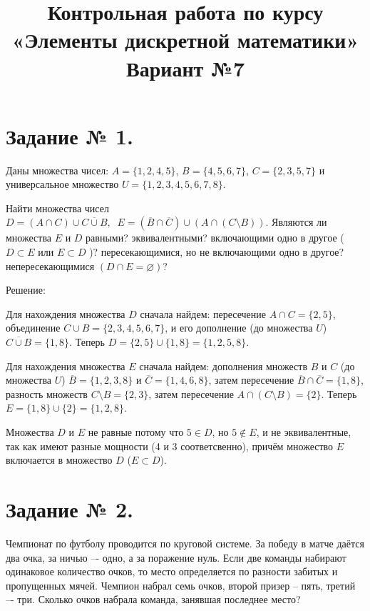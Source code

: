 \documentclass[fleqn]{article}
\title{Контрольная работа по курсу «Элементы дискретной математики»\\
Вариант №7}
\begin{document}
\date{}
\maketitle
\section*{Задание № 1.}

Даны множества чисел: $A=\{1,2,4,5\}$, $B=\{4,5,6,7\}$, $C=\{2,3,5,7\}$ и универсальное множество $U=\{1,2,3,4,5,6,7,8\}$.

Найти множества чисел $D=(A\cap C)\cup \overline{C\cup B},\;\; E=(\overline{B}\cap \overline{C})\cup(A\cap(C\setminus B))$. Являются ли множества $E$ и $D$ равными? эквивалентными? включающими одно в другое ( $D \subset E$ или $E \subset D$ )? пересекающимися, но не включающими одно в другое? непересекающимися $(D\cap E=\varnothing)$?

\begin{center}Решение:\end{center}

Для нахождения множества $D$ сначала найдем: пересечение $A\cap C=\{2,5\}$, объединение $C\cup B=\{2,3,4,5,6,7\}$, и его дополнение (до множества $U$) $\overline{C\cup B}=\{1,8\}$. Теперь $D=\{2,5\}\cup\{1,8\}=\{1,2,5,8\}$.

Для нахождения множества $E$ сначала найдем: дополнения множеств $B$ и $C$ (до множества $U$) $\overline{B}=\{1,2,3,8\}$ и $\overline{C}=\{1,4,6,8\}$, затем пересечение $\overline{B}\cap \overline{C}=\{1,8\}$, разность множеств $C\setminus B=\{2,3\}$, затем пересечение $A\cap(C\setminus B)=\{2\}$. Теперь $E=\{1,8\}\cup\{2\}=\{1,2,8\}$.

Множества $D$ и $E$ не равные потому что $5\in D$, но $5\notin E$, и не эквивалентные, так как имеют разные мощности (4 и 3 соответсвенно), причём множество $E$ включается в множество $D$ ($E \subset D$).

\section*{Задание № 2.}

Чемпионат по футболу проводится по круговой системе. За победу в матче даётся два очка, за ничью –- одно, а за поражение нуль. Если две команды набирают одинаковое количество очков, то место определяется по разности забитых и пропущенных мячей. Чемпион набрал семь очков, второй призер -- пять, третий –- три. Сколько очков набрала команда, занявшая последнее место?
\end{document}
